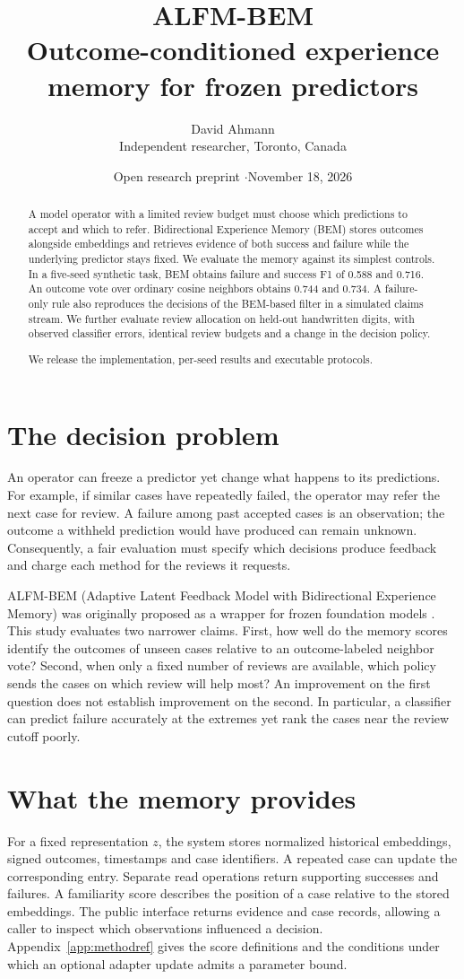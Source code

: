 \documentclass[11pt,letterpaper]{article}
\title{\textbf{ALFM-BEM}\\[3pt]\large Outcome-conditioned experience memory for frozen predictors}
\author{David Ahmann\\ \small Independent researcher, Toronto, Canada}
\date{Open research preprint \quad$\cdot$\quad November 18, 2026}
\begin{document}
\maketitle
\begin{abstract}
A model operator with a limited review budget must choose which predictions to
accept and which to refer. Bidirectional Experience Memory (BEM) stores outcomes
alongside embeddings and retrieves evidence of both success and failure while
the underlying predictor stays fixed. We evaluate the memory against its
simplest controls. In a five-seed synthetic task, BEM obtains failure and
success F1 of 0.588 and 0.716. An outcome vote over ordinary cosine neighbors
obtains 0.744 and 0.734. A failure-only rule also reproduces the decisions of
the BEM-based filter in a simulated claims stream. We further evaluate review
allocation on held-out handwritten digits, with observed classifier errors,
identical review budgets and a change in the decision policy.

We release the implementation, per-seed results and executable protocols.
\end{abstract}

\section{The decision problem}
An operator can freeze a predictor yet change what happens to its predictions.
For example, if similar cases have repeatedly failed, the operator may refer
the next case for review. A failure among past accepted cases is an observation;
the outcome a withheld prediction would have produced can remain unknown.
Consequently, a fair evaluation must specify which decisions produce feedback
and charge each method for the reviews it requests.

ALFM-BEM (Adaptive Latent Feedback Model with Bidirectional Experience Memory)
was originally proposed as a wrapper for frozen foundation models \citep{ahmann}.
This study evaluates two narrower claims. First, how well do the memory scores
identify the outcomes of unseen cases relative to an outcome-labeled neighbor
vote? Second, when only a fixed number of reviews are available, which policy
sends the cases on which review will help most? An improvement on the first
question does not establish improvement on the second. In particular, a
classifier can predict failure accurately at the extremes yet rank the cases
near the review cutoff poorly.

\section{What the memory provides}
For a fixed representation $z$, the system stores normalized historical
embeddings, signed outcomes, timestamps and case identifiers. A repeated case
can update the corresponding entry. Separate read operations return supporting
successes and failures. A familiarity score describes the position of a case
relative to the stored embeddings. The public interface returns evidence and
case records, allowing a caller to inspect which observations influenced a
decision. Appendix~\ref{app:methodref} gives the score definitions and the
conditions under which an optional adapter update admits a parameter bound.
\end{document}
